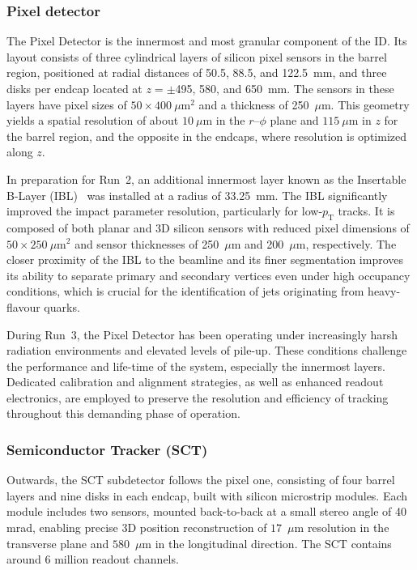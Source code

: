 \subsubsection*{Pixel detector}

The Pixel Detector is the innermost and most granular component of the ID. Its layout consists of three cylindrical layers of silicon pixel sensors in the barrel region, positioned at radial distances of 50.5, 88.5, and 122.5~mm, and three disks per endcap located at $z = \pm$495, 580, and 650~mm. The sensors in these layers have pixel sizes of $50 \times 400~\mu\text{m}^2$ and a thickness of 250~$\mu$m. This geometry yields a spatial resolution of about $10~\mu$m in the $r\text{--}\phi$ plane and $115~\mu$m in $z$ for the barrel region, and the opposite in the endcaps, where resolution is optimized along $z$.

In preparation for Run~2, an additional innermost layer known as the Insertable B-Layer (IBL)~\cite{IBL} was installed at a radius of 33.25~mm. The IBL significantly improved the impact parameter resolution, particularly for low-$p_{\mathrm{T}}$ tracks. It is composed of both planar and 3D silicon sensors with reduced pixel dimensions of $50 \times 250~\mu\text{m}^2$ and sensor thicknesses of 250~$\mu$m and 200~$\mu$m, respectively. The closer proximity of the IBL to the beamline and its finer segmentation improves its ability to separate primary and secondary vertices even under high occupancy conditions, which is crucial for the identification of jets originating from heavy-flavour quarks.

During Run~3, the Pixel Detector has been operating under increasingly harsh radiation environments and elevated levels of pile-up. These conditions challenge the performance and life-time of the system, especially the innermost layers. Dedicated calibration and alignment strategies, as well as enhanced readout electronics, are employed to preserve the resolution and efficiency of tracking throughout this demanding phase of operation.

\subsubsection*{Semiconductor Tracker (SCT)}

Outwards, the SCT subdetector follows the pixel one, consisting of four barrel layers and nine disks in each endcap, built with silicon microstrip modules. Each module includes two sensors, mounted back-to-back at a small stereo angle of 40 mrad, enabling precise 3D position reconstruction of $17$~$\mu$m resolution in the transverse plane and $580$~$\mu$m in the longitudinal direction. 
The SCT contains around 6 million readout channels.

